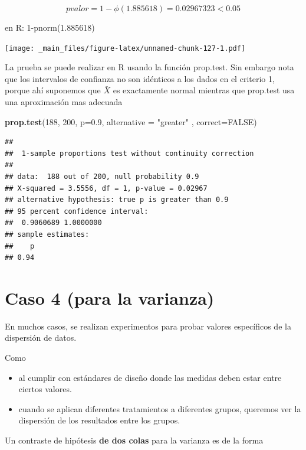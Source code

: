 \documentclass[
]{book}
\newenvironment{Shaded}{\begin{snugshade}}{\end{snugshade}}
\newcommand{\AttributeTok}[1]{\textcolor[rgb]{0.13,0.29,0.53}{#1}}
\newcommand{\ConstantTok}[1]{\textcolor[rgb]{0.56,0.35,0.01}{#1}}
\newcommand{\DecValTok}[1]{\textcolor[rgb]{0.00,0.00,0.81}{#1}}
\newcommand{\FloatTok}[1]{\textcolor[rgb]{0.00,0.00,0.81}{#1}}
\newcommand{\FunctionTok}[1]{\textcolor[rgb]{0.13,0.29,0.53}{\textbf{#1}}}
\newcommand{\NormalTok}[1]{#1}
\newcommand{\StringTok}[1]{\textcolor[rgb]{0.31,0.60,0.02}{#1}}
\begin{document}
\[pvalor=1-\phi(1.885618)=0.02967323<0.05\]

en R: 1-pnorm(1.885618)

\texttt{[image: \_main\_files/figure-latex/unnamed-chunk-127-1.pdf]}

La prueba se puede realizar en R usando la función prop.test. Sin embargo nota que los intervalos de confianza no son idénticos a los dados en el criterio 1, porque ahí suponemos que \(\bar{X}\) es exactamente normal mientras que prop.test usa una aproximación mas adecuada

\begin{Shaded}
\begin{Highlighting}[]
\FunctionTok{prop.test}\NormalTok{(}\DecValTok{188}\NormalTok{, }\DecValTok{200}\NormalTok{, }\AttributeTok{p=}\FloatTok{0.9}\NormalTok{, }\AttributeTok{alternative =} \StringTok{"greater"}\NormalTok{ , }\AttributeTok{correct=}\ConstantTok{FALSE}\NormalTok{)}
\end{Highlighting}
\end{Shaded}

\begin{verbatim}
## 
##  1-sample proportions test without continuity correction
## 
## data:  188 out of 200, null probability 0.9
## X-squared = 3.5556, df = 1, p-value = 0.02967
## alternative hypothesis: true p is greater than 0.9
## 95 percent confidence interval:
##  0.9060689 1.0000000
## sample estimates:
##    p 
## 0.94
\end{verbatim}

\hypertarget{caso-4-para-la-varianza}{%
\section{Caso 4 (para la varianza)}\label{caso-4-para-la-varianza}}

En muchos casos, se realizan experimentos para probar valores específicos de la dispersión de datos.

Como

\begin{itemize}
\item
  al cumplir con estándares de diseño donde las medidas deben estar entre ciertos valores.
\item
  cuando se aplican diferentes tratamientos a diferentes grupos, queremos ver la dispersión de los resultados entre los grupos.
\end{itemize}

Un contraste de hipótesis \textbf{de dos colas} para la varianza es de la forma
\end{document}

